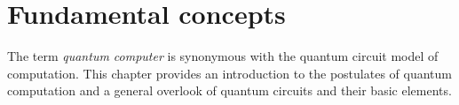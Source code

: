 \chapter{Fundamental concepts}
The term \emph{quantum computer} is synonymous with the quantum circuit model of computation. This chapter provides an introduction to the postulates of quantum computation and a general overlook of quantum circuits and their basic elements.


